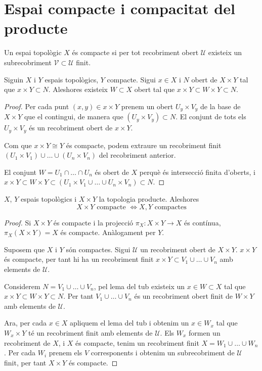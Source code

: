 \section{Espai compacte i compacitat del producte}

\begin{defi}
	Un espai topològic $X$ és compacte si per tot recobriment obert $\mathcal{U}$ existeix un subrecobriment $\mathcal{V}\subset\mathcal{U}$ finit.
\end{defi}

\begin{lema}
	Siguin $X$ i $Y$ espais topològics, $Y$ compacte. Sigui $x\in X$ i $N$ obert de $X \times Y$ tal que $x\times Y \subset N$.
	Aleshores existeix $W \subset X$ obert tal que $x\times Y \subset W \times Y \subset N$.
\end{lema}
\begin{proof}
	Per cada punt $(x,y) \in x\times Y$ prenem un obert $U_y\times V_y$ de la base de $X\times Y$ que el contingui, de manera que $(U_y\times V_y) \subset N$. El conjunt de tots els $U_y\times V_y$ és un recobriment obert de $x\times Y$.

	Com que $x \times Y \cong Y$ és compacte, podem extraure un recobriment finit $(U_1 \times V_1) \cup\dots\cup (U_n \times V_n)$ del recobriment anterior.

	El conjunt $W = U_1 \cap\dots\cap U_n$ és obert de $X$ perquè és intersecció finita d'oberts, i $x \times Y \subset W\times Y \subset (U_1 \times V_1 \cup\dots\cup U_n \times V_n) \subset N$.
\end{proof}

\begin{prop}
	$X$, $Y$ espais topològics i $X \times Y$ la topologia producte. Aleshores
	\[X \times Y \text{ compacte } \Longleftrightarrow X,Y \text{ compactes}\]
\end{prop}
\begin{proof}
	Si $X \times Y$ és compacte i la projecció $\pi_X\!: X \times Y \rightarrow X$ és contínua, $\pi_X(X\times Y)=X$ és compacte. Anàlogament per $Y$.

	\quad

	Suposem que $X$ i $Y$ són compactes. Sigui $\mathcal{U}$ un recobriment obert de $X \times Y$. $x \times Y$ és compacte, per tant hi ha un recobriment finit $x \times Y \subset V_1 \cup\dots\cup V_n$ amb elements de $\mathcal{U}$.

	Considerem $N = V_1 \cup\dots\cup V_n$, pel lema del tub existeix un $x \in W \subset X$ tal que $x\times Y \subset W \times Y \subset N$. Per tant $V_1 \cup\dots\cup  V_n$ és un recobriment obert finit de $W \times Y$ amb elements de $\mathcal{U}$.

	Ara, per cada $x\in X$ apliquem el lema del tub i obtenim un $x \in W_x$ tal que $W_x \times Y$ té un recobriment finit amb elements de $\mathcal{U}$. Els $W_x$ formen un recobriment de $X$, i $X$ és compacte, tenim un recobriment finit $X = W_1 \cup\dots\cup W_n$. Per cada $W_i$ prenem els $V$ corresponents i obtenim un subrecobriment de $\mathcal{U}$ finit, per tant $X\times Y$ és compacte.

\end{proof}


